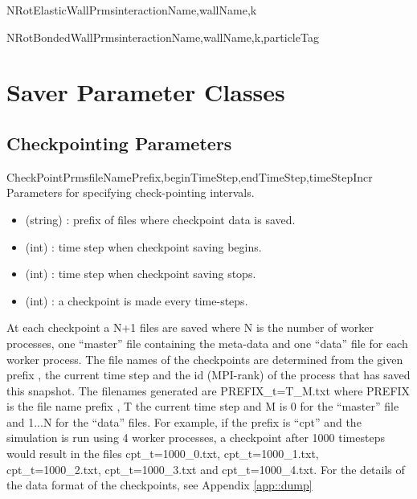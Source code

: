 \documentclass{manual}
\begin{document}
\begin{classdesc}{NRotElasticWallPrms}{interactionName,wallName,k}
\end{classdesc}


\begin{classdesc}{NRotBondedWallPrms}{interactionName,wallName,k,particleTag}
\end{classdesc}

\section{Saver Parameter Classes}
\subsection{Checkpointing Parameters}
\label{subsec::checkpointparams}

\begin{classdesc}{CheckPointPrms}{fileNamePrefix,beginTimeStep,endTimeStep,timeStepIncr}
Parameters for specifying check-pointing intervals.
\begin{itemize}
\item {} (string) : prefix of files where checkpoint data is saved.
\item {} (int) : time step when checkpoint saving begins.
\item {} (int) : time step when checkpoint saving stops.
\item {} (int) : a checkpoint is made every  time-steps.
\end{itemize}
At each checkpoint a N+1 files are saved where N is the number of worker processes, one ``master'' file containing the meta-data and one ``data'' file for each worker process. The file names of the checkpoints are determined from the given prefix , the current time step and the id (MPI-rank) of the process that has saved this snapshot. The filenames generated are PREFIX_t=T_M.txt where PREFIX is the file name prefix , T the current time step and M is 0 for the ``master'' file and 1...N for the ``data'' files. For example, if the prefix is ``cpt'' and the simulation is run using 4 worker processes, a checkpoint after 1000 timesteps would result in the files cpt_t=1000_0.txt, cpt_t=1000_1.txt, cpt_t=1000_2.txt, cpt_t=1000_3.txt and  cpt_t=1000_4.txt. For the details of the data format of the checkpoints, see Appendix \ref{app::dump}
\end{classdesc}
\end{document}
